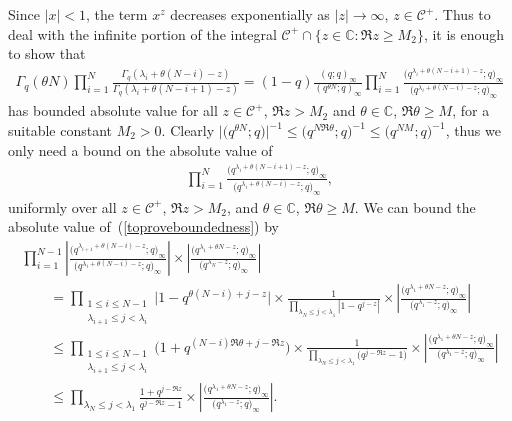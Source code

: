 \documentclass[11pt]{article}
\numberwithin{equation}{section}
\newcommand{\C}{\mathbb{C}}
\newcommand{\CC}{\mathcal{C}}
\begin{document}
Since $|x| < 1$, the term $x^z$ decreases exponentially as $|z|\rightarrow\infty$, $z\in\CC^+$. Thus to deal with the inf\/inite portion of the integral $\CC^+\cap\{z\in\C\colon \Re z \geq M_2\}$, it is enough to show that
\begin{gather*}
\Gamma_q(\theta N)\prod_{i=1}^N{\frac{\Gamma_q(\lambda_i + \theta(N - i) - z)}{\Gamma_q(\lambda_i + \theta(N - i + 1) - z)}} = (1 - q)\frac{(q; q)_{\infty}}{(q^{\theta N}; q)_{\infty}}\prod_{i=1}^N{\frac{\big(q^{\lambda_i + \theta(N - i + 1) - z}; q\big)_{\infty}}{\big(q^{\lambda_i + \theta (N - i) - z}; q\big)_{\infty}}}
\end{gather*}
has bounded absolute value for all $z\in\CC^+$, $\Re z > M_2$ and $\theta\in\C$, $\Re\theta \geq M$, for a suitable constant $M_2 > 0$. Clearly $\big|\big(q^{\theta N}; q\big)\big|^{-1} \leq \big(q^{N\Re\theta}; q\big)^{-1} \leq \big(q^{NM}; q\big)^{-1}$, thus we only need a bound on the absolute value of
\begin{gather}\label{toproveboundedness}
\prod_{i=1}^N{\frac{\big(q^{\lambda_i + \theta(N - i + 1) - z}; q\big)_{\infty}}{\big(q^{\lambda_i + \theta (N - i) - z}; q\big)_{\infty}}},
\end{gather}
uniformly over all $z\in\CC^+$, $\Re z > M_2$, and $\theta\in\C$, $\Re\theta \geq M$. We can bound the absolute value of~(\ref{toproveboundedness}) by
\begin{gather*}
\prod_{i=1}^{N-1}{\left|\frac{\big(q^{\lambda_{i+1} + \theta(N - i) - z}; q\big)_{\infty}}{\big(q^{\lambda_i + \theta (N - i) - z}; q\big)_{\infty}}\right|}\times\left|\frac{\big(q^{\lambda_1 + \theta N - z}; q\big)_{\infty}}{\big(q^{\lambda_N - z}; q\big)_{\infty}}\right|\\
\qquad{} = \prod_{ \substack{1\leq i\leq N - 1 \\ \lambda_{i+1} \leq j < \lambda_i} }{\big|1 - q^{\theta(N - i) + j - z}\big|}\times\frac{1}{\prod\limits_{\lambda_N \leq j < \lambda_1}{|1 - q^{j - z}|}}
\times\left|\frac{\big(q^{\lambda_1 + \theta N - z}; q\big)_{\infty}}{\big(q^{\lambda_1 - z}; q\big)_{\infty}}\right|\\
\qquad{} \leq \prod_{ \substack{1\leq i\leq N - 1 \\ \lambda_{i+1} \leq j < \lambda_i} }{\big(1 + q^{(N - i)\Re\theta + j - \Re z}\big)}\times\frac{1}{\prod\limits_{\lambda_N \leq j < \lambda_1}{\big(q^{j-\Re z} - 1\big)}}\times\left|\frac{\big(q^{\lambda_1 + \theta N - z}; q\big)_{\infty}}{\big(q^{\lambda_1 - z}; q\big)_{\infty}}\right|\\
\qquad{} \leq \prod_{\lambda_N \leq j < \lambda_1}{\frac{1 + q^{j - \Re z}}{q^{j - \Re z} - 1}}\times\left|\frac{\big(q^{\lambda_1 + \theta N - z}; q\big)_{\infty}}{\big(q^{\lambda_1 - z}; q\big)_{\infty}}\right|.
\end{gather*}
\end{document}
